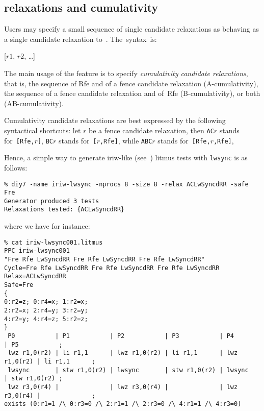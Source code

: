 \subsection{ relaxations and cumulativity}
Users may specify a small sequence of single candidate relaxations
as behaving as a single candidate relaxation to~\diy. The~syntax~is:
\begin{center}
[$r1$, $r2$, \ldots]
\end{center}
The main usage of the feature is to specify
\emph{cumulativity candidate relaxations},
that is, the sequence of Rfe and of a fence candidate relaxation
(A-cumulativity),
the sequence of a fence candidate relaxation and of~Rfe (B-cumulativity),
or both (AB-cumulativity).

Cumulativity candidate relaxations are best expressed by the following
syntactical shortcuts:
let $r$ be a fence candidate relaxation, then
\texttt{AC}$r$ stands for~\texttt{[Rfe,}$r$\texttt{]},
\texttt{BC}$r$ stands for~\texttt{[}$r$\texttt{,Rfe]},
while \texttt{ABC}$r$ stands for~\texttt{[Rfe,}$r$\texttt{,Rfe]},

Hence, a simple way to generate iriw-like (see~\mysec{\ref{iriw}})
litmus tests  with \texttt{lwsync} is as follows:
\begin{verbatim}
% diy7 -name iriw-lwsync -nprocs 8 -size 8 -relax ACLwSyncdRR -safe Fre
Generator produced 3 tests
Relaxations tested: {ACLwSyncdRR}
\end{verbatim}
where we have for instance:
\begin{verbatim}
% cat iriw-lwsync001.litmus
PPC iriw-lwsync001
"Fre Rfe LwSyncdRR Fre Rfe LwSyncdRR Fre Rfe LwSyncdRR"
Cycle=Fre Rfe LwSyncdRR Fre Rfe LwSyncdRR Fre Rfe LwSyncdRR
Relax=ACLwSyncdRR
Safe=Fre
{
0:r2=z; 0:r4=x; 1:r2=x;
2:r2=x; 2:r4=y; 3:r2=y;
4:r2=y; 4:r4=z; 5:r2=z;
}
 P0           | P1           | P2           | P3           | P4           | P5           ;
 lwz r1,0(r2) | li r1,1      | lwz r1,0(r2) | li r1,1      | lwz r1,0(r2) | li r1,1      ;
 lwsync       | stw r1,0(r2) | lwsync       | stw r1,0(r2) | lwsync       | stw r1,0(r2) ;
 lwz r3,0(r4) |              | lwz r3,0(r4) |              | lwz r3,0(r4) |              ;
exists (0:r1=1 /\ 0:r3=0 /\ 2:r1=1 /\ 2:r3=0 /\ 4:r1=1 /\ 4:r3=0)
\end{verbatim}

